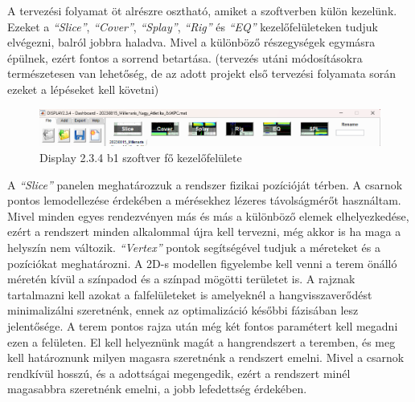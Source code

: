 A tervezési folyamat öt alrészre osztható, amiket a szoftverben külön kezelünk.
Ezeket a \textit{``Slice''}, \textit{``Cover''}, \textit{``Splay''}, \textit{``Rig''} és \textit{``EQ''} kezelőfelületeken tudjuk elvégezni,
balról jobbra haladva. Mivel a különböző részegységek egymásra épülnek, ezért fontos a sorrend betartása.
(tervezés utáni módosításokra természetesen van lehetőség, de az adott projekt első tervezési folyamata során ezeket a lépéseket kell követni)
\begin{figure}[H]
    \centering
    \includegraphics[width=\textwidth, keepaspectratio]{figures/display_wpc_0_1.png}
    \caption{Display 2.3.4 b1 szoftver fő kezelőfelülete}\label{fig:display_wpc_0_1}
\end{figure}
A \textit{``Slice''} panelen meghatározzuk a rendszer fizikai pozícióját térben. A csarnok
pontos lemodellezése érdekében a mérésekhez lézeres távolságmérőt használtam.
Mivel minden egyes rendezvényen más és más a különböző elemek elhelyezkedése, ezért a
rendszert minden alkalommal újra kell tervezni, még akkor is ha maga a helyszín nem változik.
\textit{``Vertex''} pontok segítségével tudjuk a méreteket és a pozíciókat meghatározni.
A 2D-s modellen figyelembe kell venni a terem önálló méretén kívül a színpadod és a színpad mögötti területet is.
A rajznak tartalmazni kell azokat a falfelületeket is amelyeknél a hangvisszaverődést minimalizálni szeretnénk,
ennek az optimalizáció későbbi fázisában lesz jelentősége.
A terem pontos rajza után még két fontos paramétert kell megadni ezen a felületen.
El kell helyeznünk magát a hangrendszert a teremben, és meg kell határoznunk milyen magasra szeretnénk a rendszert emelni.
Mivel a csarnok rendkívül hosszú, és a adottságai megengedik, ezért a rendszert minél magasabbra szeretnénk emelni, 
a jobb lefedettség érdekében.


